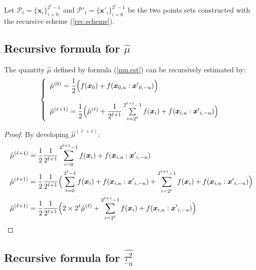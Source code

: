 \documentclass[]{elsarticle}
\theoremstyle{definition}
\newcommand{\bvec}[1]{\boldsymbol{#1}}
\newcommand{\vx}{\bvec{x}}
\begin{document}
Let $\mathcal{P}_\ell=\{\vx_i\}_{i=0}^{2^\ell-1}$ and $\mathcal{P}'_\ell=\{{\vx'}_i\}_{i=0}^{2^\ell-1}$ be the two points sets constructed with the recursive scheme (\ref{rec.scheme}).  

\subsection{Recursive formula for $\hat{\mu}$}

The quantity $\hat{\mu}$ defined by formula (\ref{mu.est}) can be recursively estimated by:
\[\left \lbrace\begin{array}{l}
\hat{\mu}^{(0)} = \dfrac{1}{2} \Big{(} f(\vx_0)+f(\vx_{0,u}:{\vx'}_{0,-u}) \Big{)} \\
\\
\hat{\mu}^{(\ell+1)} = \dfrac{1}{2} \Big{(} \hat{\mu}^{(\ell)} + \dfrac{1}{2^{\ell+1}} \sum \limits_{i=2^{\ell}}^{2^{\ell+1}-1} f(\vx_i) + f(\vx_{i,u}:{\vx'}_{i,-u}) \Big{)}
\end{array}\right.\]
\begin{proof}
By developing $\hat{\mu}^{(\ell+1)}$:
\begin{align*}
\hat{\mu}^{(\ell+1)} &= \dfrac{1}{2} \dfrac{1}{2^{\ell+1}} \sum \limits_{i=0}^{2^{\ell+1}-1} f(\vx_i) + f(\vx_{i,u}:{\vx'}_{i,-u}) \\
\hat{\mu}^{(\ell+1)} &= \dfrac{1}{2} \dfrac{1}{2^{\ell+1}} \Big{(} \sum \limits_{i=0}^{2^{\ell}-1} f(\vx_i) + f(\vx_{i,u}:{\vx'}_{i,-u}) + \sum \limits_{i=2^{\ell}}^{2^{\ell+1}-1} f(\vx_i) + f(\vx_{i,u}:{\vx'}_{i,-u}) \Big{)}\\
\hat{\mu}^{(\ell+1)} &= \dfrac{1}{2} \dfrac{1}{2^{\ell+1}} \Big{(} 2 \times 2^{\ell}\hat{\mu}^{(\ell)} + \sum \limits_{i=2^{\ell}}^{2^{\ell+1}-1} f(\vx_i) + f(\vx_{i,u}:{\vx'}_{i,-u}) \Big{)}\\
\end{align*}
\end{proof}


\subsection{Recursive formula for $\widehat{\underline{\tau}_u^2}$}
\end{document}
